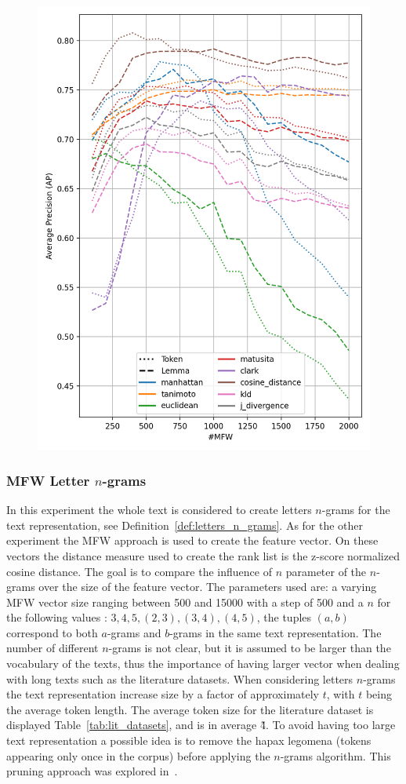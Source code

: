 \begin{figure}
  \label{fig:token_vs_lemma_st_jean}
  \includegraphics[width=0.9\linewidth]{img/token_vs_lemma_st_jean.png}
\end{figure}

\subsubsection{MFW Letter $n$-grams}

In this experiment the whole text is considered to create letters $n$-grams for the text representation, see Definition~\ref{def:letters_n_grams}.
As for the other experiment the MFW approach is used to create the feature vector.
On these vectors the distance measure used to create the rank list is the z-score normalized cosine distance.
The goal is to compare the influence of $n$ parameter of the $n$-grams over the size of the feature vector.
The parameters used are: a varying MFW vector size ranging between 500 and 15000 with a step of 500 and a $n$ for the following values : $3, 4, 5, (2, 3), (3, 4), (4, 5)$, the tuples $(a, b)$ correspond to both $a$-grams and $b$-grams in the same text representation.
The number of different $n$-grams is not clear, but it is assumed to be larger than the vocabulary of the texts, thus the importance of having larger vector when dealing with long texts such as the literature datasets.
When considering letters $n$-grams the text representation increase size by a factor of approximately $t$, with $t$ being the average token length.
The average token size for the literature dataset is displayed Table~\ref{tab:lit_datasets}, and is in average \~4.
To avoid having too large text representation a possible idea is to remove the hapax legomena (tokens appearing only once in the corpus) before applying the $n$-grams algorithm.
This pruning approach was explored in~\cite{kocher_linking}.


